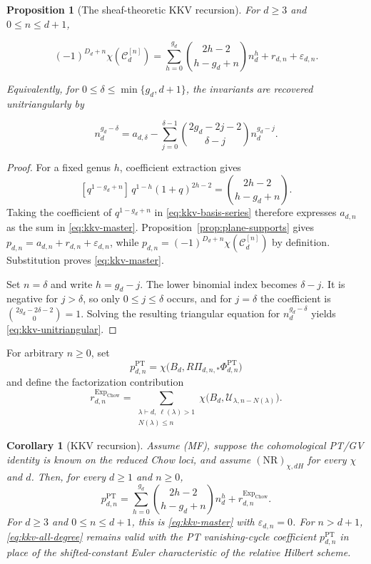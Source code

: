 \documentclass[11pt,reqno]{amsart}
\newtheorem{proposition}[theorem]{Proposition}
\newtheorem{corollary}[theorem]{Corollary}
\theoremstyle{definition}
\newcommand{\PT}{\operatorname{PT}}
\newcommand{\ExpChow}{\operatorname{Exp}_{\mathrm{Chow}}}
\begin{document}
\begin{proposition}[The sheaf-theoretic KKV recursion]
\label{prop:kkv-recursion}
For $d\ge3$ and $0\le n\le d+1$,

\begin{equation}\label{eq:kkv-master}
  (-1)^{D_d+n}\chi(\mathcal C_d^{[n]})
  =
  \sum_{h=0}^{g_d}
  \binom{2h-2}{h-g_d+n}n_d^h
  +r_{d,n}+\varepsilon_{d,n}.
\end{equation}

Equivalently, for
$0\le\delta\le\min\{g_d,d+1\}$, the invariants are recovered
unitriangularly by

\begin{equation}\label{eq:kkv-unitriangular}
  n_d^{g_d-\delta}
  =a_{d,\delta}
   -\sum_{j=0}^{\delta-1}
    \binom{2g_d-2j-2}{\delta-j}n_d^{g_d-j}.
\end{equation}
\end{proposition}

\begin{proof}
For a fixed genus $h$, coefficient extraction gives
\[
 [q^{1-g_d+n}]\,q^{1-h}(1+q)^{2h-2}
 =\binom{2h-2}{h-g_d+n}.
\]
Taking the coefficient of $q^{1-g_d+n}$ in
\eqref{eq:kkv-basis-series} therefore expresses $a_{d,n}$ as the sum in
\eqref{eq:kkv-master}.  Proposition~\ref{prop:plane-supports} gives
$p_{d,n}=a_{d,n}+r_{d,n}+\varepsilon_{d,n}$, while
$p_{d,n}=(-1)^{D_d+n}\chi(\mathcal C_d^{[n]})$ by definition.  Substitution
proves \eqref{eq:kkv-master}.

Set $n=\delta$ and write $h=g_d-j$.  The lower binomial index becomes
$\delta-j$.  It is negative for $j>\delta$, so only
$0\le j\le\delta$ occurs, and for $j=\delta$ the coefficient is
$\binom{2g_d-2\delta-2}{0}=1$.  Solving the resulting triangular equation
for $n_d^{g_d-\delta}$ yields \eqref{eq:kkv-unitriangular}.
\end{proof}

For arbitrary $n\ge0$, set
\[
 p_{d,n}^{\PT}
 =\chi\bigl(B_d,R\Pi_{d,n,*}\Phi_{d,n}^{\PT}\bigr)
\]
and define the factorization contribution
\begin{equation}\label{eq:kkv-all-degree-factorization}
 r_{d,n}^{\ExpChow}
 =\sum_{\substack{\lambda\vdash d,\ \ell(\lambda)>1\\
                   N(\lambda)\le n}}
   \chi\bigl(B_d,\mathcal U_{\lambda,n-N(\lambda)}\bigr).
\end{equation}

\begin{corollary}[KKV recursion]
\label{cor:kkv-all-degree-nr}
Assume \emph{(MF)}, suppose the cohomological PT/GV identity is known on
the reduced Chow loci, and assume $(\mathrm{NR})_{\chi,dH}$ for every
$\chi$ and $d$.  Then, for every $d\ge1$ and $n\ge0$,
\begin{equation}\label{eq:kkv-all-degree}
 p_{d,n}^{\PT}
 =\sum_{h=0}^{g_d}
   \binom{2h-2}{h-g_d+n}n_d^h
  +r_{d,n}^{\ExpChow}.
\end{equation}
For $d\ge3$ and $0\le n\le d+1$, this is
\eqref{eq:kkv-master} with $\varepsilon_{d,n}=0$.  For $n>d+1$,
\eqref{eq:kkv-all-degree} remains valid with the PT vanishing-cycle
coefficient $p_{d,n}^{\PT}$ in place of the shifted-constant Euler
characteristic of the relative Hilbert scheme.
\end{corollary}
\end{document}
